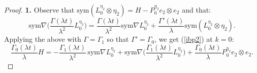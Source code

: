 \documentclass[reqno,twoside,11pt]{amsart}
\newcommand{\sym}{\mathrm{sym}}
\numberwithin{equation}{section}
\theoremstyle{plain}
\theoremstyle{definition}
\begin{document}
\begin{proof}
{\bf 1.} Observe that $\sym(L_0^{\eta_2}\otimes \eta_2)=
H-P_0^{\eta_2} e_2\otimes e_2$ and that: 
$$ \sym\nabla \Big(\frac{\Gamma(\lambda t)}{\lambda^2} L_0^{\eta_2}\Big)
= \frac{\Gamma(\lambda t)}{\lambda^2}\sym\nabla L_0^{\eta_2} +
\frac{\Gamma'(\lambda t)}{\lambda}\sym(L_0^{\eta_2}\otimes \eta_2).$$
Applying the above with $\Gamma=\Gamma_1$ so that $\Gamma'=\Gamma_0$,
we get (\ref{ibp2}) at $k=0$:
\begin{equation}\label{naua}
\frac{\Gamma_0(\lambda t)}{\lambda}H = -\frac{\Gamma_{1}(\lambda
  t)}{\lambda^{2}} \, \sym\nabla L_0^{\eta_2}  + \sym\nabla
\Big(\frac{\Gamma_{1}(\lambda t)}{\lambda^{2}} L_0^{\eta_2}\Big) 
+ \frac{\Gamma_0(\lambda t)}{\lambda} P_0^{\eta_2} e_2\otimes e_2.
\end{equation}

\smallskip


\end{proof}
\end{document}
